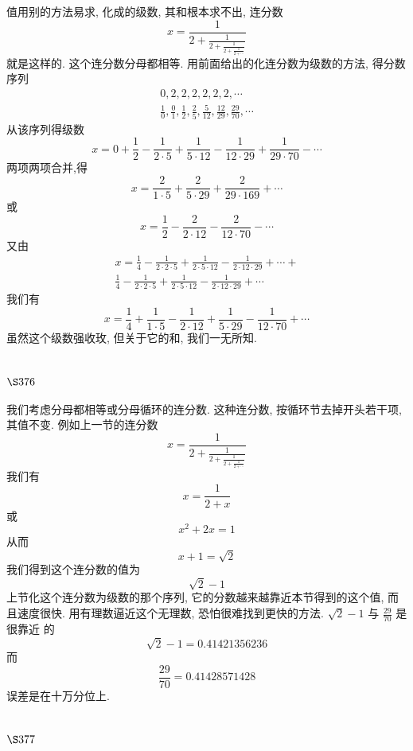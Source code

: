 值用别的方法易求, 化成的级数, 其和根本求不出, 连分数
\[
x=\frac{1}{2+\frac{1}{2+\frac{1}{2+\frac{1}{2+\cdots}}}}
\]
就是这样的. 这个连分数分母都相等. 用前面给出的化连分数为级数的方法, 得分数序列
\[
\begin{gathered}
0,2,2,2,2,2,2, \cdots \\
\frac{1}{0}, \frac{0}{1}, \frac{1}{2}, \frac{2}{5}, \frac{5}{12}, \frac{12}{29}, \frac{29}{70}, \cdots
\end{gathered}
\]
从该序列得级数
\[
x=0+\frac{1}{2}-\frac{1}{2 \cdot 5}+\frac{1}{5 \cdot 12}-\frac{1}{12 \cdot 29}+\frac{1}{29 \cdot 70}-\cdots
\]
两项两项合并,得
\[
x=\frac{2}{1 \cdot 5}+\frac{2}{5 \cdot 29}+\frac{2}{29 \cdot 169}+\cdots
\]
或
\[
x=\frac{1}{2}-\frac{2}{2 \cdot 12}-\frac{2}{12 \cdot 70}-\cdots
\]
又由
\[
\begin{gathered}
x=\frac{1}{4}-\frac{1}{2 \cdot 2 \cdot 5}+\frac{1}{2 \cdot 5 \cdot 12}-\frac{1}{2 \cdot 12 \cdot 29}+\cdots+ \\
\frac{1}{4}-\frac{1}{2 \cdot 2 \cdot 5}+\frac{1}{2 \cdot 5 \cdot 12}-\frac{1}{2 \cdot 12 \cdot 29}+\cdots
\end{gathered}
\]
我们有
\[
x=\frac{1}{4}+\frac{1}{1 \cdot 5}-\frac{1}{2 \cdot 12}+\frac{1}{5 \cdot 29}-\frac{1}{12 \cdot 70}+\cdots
\]
虽然这个级数强收玫, 但关于它的和, 我们一无所知. 

\section{$\S 376$}

我们考虑分母都相等或分母循环的连分数. 这种连分数, 按循环节去掉开头若干项, 其值不变. 例如上一节的连分数
\[
x=\frac{1}{2+\frac{1}{2+\frac{1}{2+\frac{1}{2+\cdots}}}}
\]
我们有
\[
x=\frac{1}{2+x}
\]
或
\[
x^{2}+2 x=1
\]
从而
\[
x+1=\sqrt{2}
\]
我们得到这个连分数的值为
\[
\sqrt{2}-1
\]
上节化这个连分数为级数的那个序列, 它的分数越来越靠近本节得到的这个值, 而 且速度很快. 用有理数逼近这个无理数, 恐怕很难找到更快的方法. $\sqrt{2}-1$ 与 $\frac{29}{70}$ 是很靠近 的
\[
\sqrt{2}-1=0.41421356236
\]
而
\[
\frac{29}{70}=0.41428571428
\]
误差是在十万分位上.

\section{$\S 377$}

